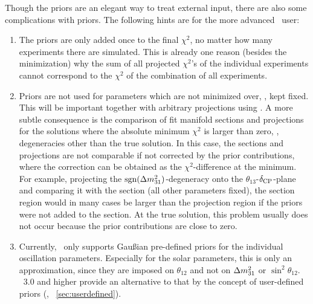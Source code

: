 Though the priors are an elegant way to treat external input, 
there are also some complications with priors. The following hints are for the
more advanced \GLOBES\ user:
\begin{enumerate}
\item
 The priors are only added once to the final $\chi^2$, no matter how
 many experiments there are simulated. This is already one reason
 (besides the minimization) why the sum of all projected $\chi^2$'s of 
 the individual experiments 
 cannot correspond to the $\chi^2$ of the combination of all experiments.
\item
 Priors are not used for parameters which are not minimized over, \ie, 
 kept fixed. This will be important together with arbitrary projections
 using . A more subtle consequence is the comparison
 of fit manifold sections and projections for the solutions where
 the absolute minimum $\chi^2$ is larger than zero, \ie, degeneracies
 other than the true solution. In this case, the sections and
 projections are not  comparable if not corrected by the prior contributions, where the
 correction can be obtained as the $\chi^2$-difference at the minimum.
 For example, projecting the $\mathrm{sgn}(\Delta m_{31}^2)$-degeneracy onto
 the $\theta_{13}$-$\delta_{\mathrm{CP}}$-plane and comparing it with the section
 (all other parameters fixed), the section region would in many cases be 
 larger than the projection region if the priors were not added to the
 section. At the true solution, this problem usually does not occur
 because the prior contributions are close to zero.    
\item
Currently, \GLOBES\ only supports Gau\ss ian pre-defined priors for the individual
oscillation parameters. Especially for the solar parameters, this is only
 an approximation, since they are imposed on $\theta_{12}$ and not
 on $\Delta m_{31}^2$ or $\sin^2  \theta_{12}$. \GLOBES\ 3.0 and higher provide an alternative
to that by the concept of user-defined priors (\cf, \Sec~\ref{sec:userdefined}).
 \end{enumerate}

 
 

